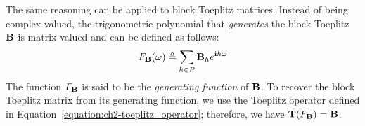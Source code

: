 \noindent
The same reasoning can be applied to block Toeplitz matrices.
Instead of being complex-valued, the trigonometric polynomial that \emph{generates} the block Toeplitz $\mathbf{B}$ is matrix-valued and can be defined as follows:
\begin{equation}
  F_{\mathbf{B}}(\omega) \triangleq \sum_{h \in P} \mathbf{B}_h e^{\mathbf{i} h \omega}
\end{equation}
The function $F_{\mathbf{B}}$ is said to be the \emph{generating function} of $\mathbf{B}$.
To recover the block Toeplitz matrix from its generating function, we use the Toeplitz operator defined in Equation~\ref{equation:ch2-toeplitz_operator}; therefore, we have $\mathbf{T}(F_\mathbf{B}) = \mathbf{B}$.







